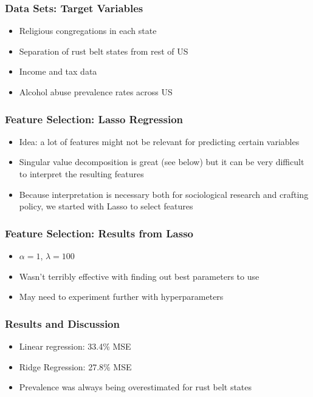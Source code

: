 \documentclass{beamer}
\begin{document}
\begin{frame}

    \frametitle{Data Sets: Target Variables}


    \begin{itemize}
      \item Religious congregations in each state
      \item Separation of rust belt states from rest of US
      \item Income and tax data
      \item Alcohol abuse prevalence rates across US
    \end{itemize}

\end{frame}

\begin{frame}

    \frametitle{Feature Selection: Lasso Regression}

    \begin{itemize}
        \item Idea: a lot of features might not be relevant for predicting certain variables
        \item Singular value decomposition is great (see below) but it can be very difficult to interpret the resulting features
        \item Because interpretation is necessary both for sociological research and crafting policy, we started with Lasso to select features
    \end{itemize}

\end{frame}

\begin{frame}

    \frametitle{Feature Selection: Results from Lasso}
    \begin{itemize}
      \item $\alpha = 1$, $\lambda = 100$
      \item Wasn't terribly effective with finding out best parameters to use
      \item May need to experiment further with hyperparameters
    \end{itemize}

\end{frame}


\begin{frame}

  \frametitle{Results and Discussion}
    \begin{itemize}
      \item Linear regression: 33.4\% MSE
      \item Ridge Regression: 27.8\% MSE
      \item Prevalence was always being overestimated for rust belt states
    \end{itemize}

\end{frame}
\end{document}
